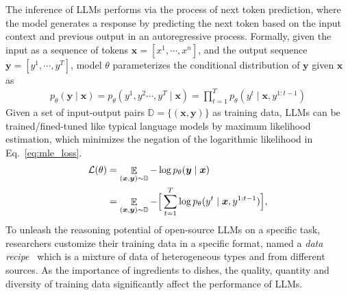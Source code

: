 The inference of LLMs performs via the process of next token prediction, where the model generates a response by predicting the next token based on the input context and previous output in an autoregressive process. 
Formally, given the input as a sequence of tokens $\bm{x} = [x^1, \cdots, x^n]$, and the output sequence $\bm{y} = [y^1, \cdots, y^T]$, model $\theta$  parameterizes the conditional distribution of $\bm{y}$ given $\bm{x}$ as 
\begin{align}
\label{eq:cond_prob}
    p_{\theta}(\bm{y} \mid \bm{x})= p_{\theta}( y^1, y^2 \cdots, y^T \mid \bm{x}) 
    = \prod_{t=1}^{T} p_{\theta}\left(y^{t} \mid 
    \bm{x} , y^{1:t-1}\right)
\end{align}
Given a set of input-output pairs $\mathbb{D} = \{ (\bm{x}, \bm{y})\}$ as training data, LLMs can be trained/fined-tuned like typical language models by maximum likelihood estimation, which minimizes the negation of the logarithmic likelihood in Eq.~\eqref{eq:mle_loss}.
\begin{align}
\label{eq:mle_loss}
    \mathcal{L}({\theta}) &=
   \mathop{\mathbb{E}}_{(\bm {x}, \bm{y}) \sim \mathbb{D}} - \log p_{\theta} (\bm{y} \mid \bm{x}) \\
   &= \mathop{\mathbb{E}}_{(\bm {x}, \bm{y}) \sim \mathbb{D}}    -  \Big[ \sum_{t=1}^T \log p_{\theta}(y^t \mid \bm{x},  y^{1:t-1})\Big]\text{,}
\end{align}
To unleash the reasoning potential of open-source LLMs on a specific task, researchers customize their training data in a specific format, named a \emph{data recipe}~\cite{DBLP:conf/sigmod/Chen0MCPGGXLGLD24} which is a mixture of data of heterogeneous types and from different sources. 
As the importance of ingredients to dishes, the quality, quantity and diversity of training data significantly affect the performance of LLMs. 
